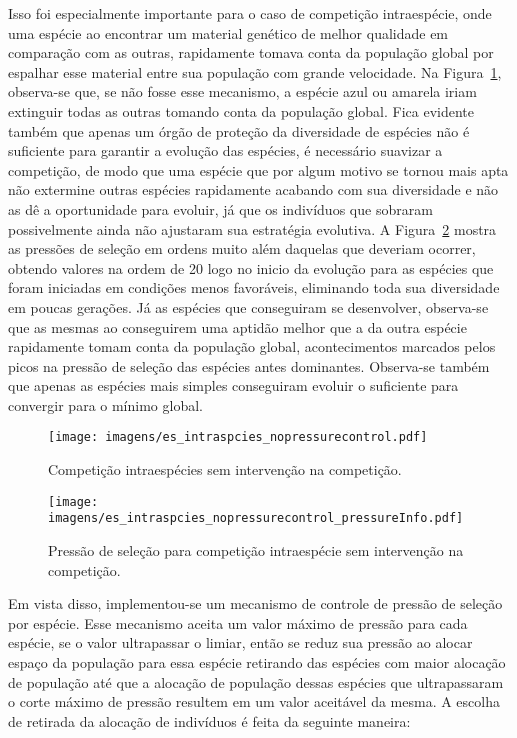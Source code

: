 Isso foi especialmente importante para o caso de competição
intraespécie, onde uma espécie ao encontrar um material genético de
melhor qualidade em comparação com as outras, rapidamente tomava conta
da população global por espalhar esse material entre sua população com
grande velocidade. Na Figura~\ref{fig:intraspecies_nopressure},
observa-se que, se não fosse esse mecanismo, a espécie azul ou amarela
iriam extinguir todas as outras tomando conta da população
global. Fica evidente também que apenas um órgão de proteção da
diversidade de espécies não é suficiente para garantir a evolução das
espécies, é necessário suavizar a competição, de modo que uma espécie
que por algum motivo se tornou mais apta não extermine outras espécies
rapidamente acabando com sua diversidade e não as dê a oportunidade
para evoluir, já que os indivíduos que sobraram possivelmente ainda não
ajustaram sua estratégia evolutiva. A 
Figura~\ref{fig:intraspecies_nopressurecontrol_info} mostra as
pressões de seleção em ordens muito além daquelas que deveriam
ocorrer, obtendo valores na ordem de 20 logo no inicio da evolução
para as espécies que foram iniciadas em condições menos favoráveis,
eliminando toda sua diversidade em poucas gerações. Já as espécies que
conseguiram se desenvolver, observa-se que as mesmas ao conseguirem
uma aptidão melhor que a da outra espécie rapidamente tomam conta da
população global, acontecimentos marcados pelos picos na pressão de
seleção das espécies antes dominantes. Observa-se também que apenas as
espécies mais simples conseguiram evoluir o suficiente para convergir
para o mínimo global.

\begin{figure}[h!t]
\centering
\texttt{[image: imagens/es\_intraspcies\_nopressurecontrol.pdf]}
\caption[Competição intraespécies sem intervenção na
competição.]{Competição intraespécies sem intervenção na competição.}
\label{fig:intraspecies_nopressure}
\end{figure}

\begin{figure}[h!t]
\centering
\texttt{[image: imagens/es\_intraspcies\_nopressurecontrol\_pressureInfo.pdf]}
\caption[Pressão de seleção para competição intraespécie sem
intervenção na competição.]{Pressão de seleção para competição
intraespécie sem intervenção na competição.}
\label{fig:intraspecies_nopressurecontrol_info}
\end{figure}

Em vista disso, implementou-se um mecanismo de controle de pressão de
seleção por espécie. Esse mecanismo aceita um valor máximo de
pressão para cada espécie, se o valor ultrapassar o limiar, então se 
reduz sua pressão ao alocar espaço da população para essa espécie
retirando das espécies com maior alocação de população até que a
alocação de população dessas espécies que ultrapassaram o corte máximo
de pressão resultem em um valor aceitável da mesma. A escolha de
retirada da alocação de indivíduos é feita da seguinte maneira:

